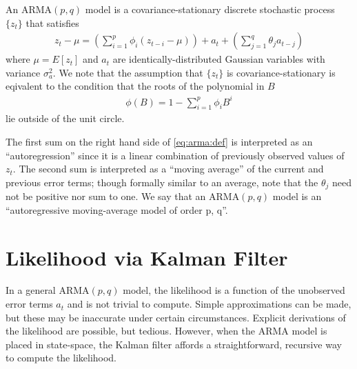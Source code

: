 \label{lab:arma}

An $\text{ARMA}(p,q)$ model is a covariance-stationary discrete stochastic
process $\{z_t\}$ that satisfies
\begin{align}
    \label{eq:arma:def}
    z_t - \mu = \left(\sum_{i=1}^p \phi_{i}(z_{t - i} - \mu)\right) + a_t +
    \left(\sum_{j=1}^{q} \theta_{j}a_{t-j} \right)
\end{align}
where $\mu = E[z_t]$ and $a_t$ are identically-distributed Gaussian variables with
variance $\sigma_a^2$. We note that the assumption that $\{z_t\}$ is
covariance-stationary is eqivalent to the condition that the roots of the
polynomial in $B$
\begin{align}
    \label{eq:arma:characteristic}
    \phi(B) = 1 - \sum_{i=1}^p\phi_iB^i
\end{align}
lie outside of the unit circle.

The first sum on the right hand side of \ref{eq:arma:def} is interpreted as an
``autoregression'' since it is a linear combination of previously observed
values of $z_t$. The second sum is interpreted as a ``moving average'' of the
current and previous error terms; though formally similar to an average, note
that the $\theta_j$ need not be positive nor sum to one. We say that an
$\text{ARMA}(p,q)$ model is an ``autoregressive moving-average model of order
p, q''.

\section*{Likelihood via Kalman Filter}

In a general $\text{ARMA}(p,q)$ model, the likelihood is a function of the
unobserved error terms $a_t$ and is not trivial to compute. Simple
approximations can be made, but these may be inaccurate under certain
circumstances. Explicit derivations of the likelihood are possible, but
tedious. However, when the $\text{ARMA}$ model is placed in state-space, the
Kalman filter affords a straightforward, recursive way to compute the
likelihood.

